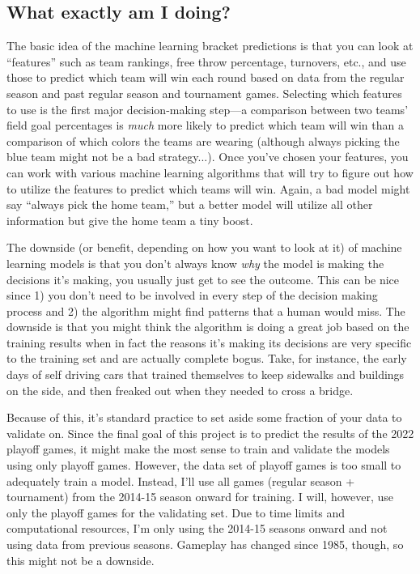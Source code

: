\documentclass[twocolumn]{aastex63}
\begin{document}
\subsection{What exactly am I doing?}
The basic idea of the machine learning bracket predictions is that you can look at ``features'' such as team rankings, free throw percentage, turnovers, etc., and use those to predict which team will win each round based on data from the regular season and past regular season and tournament games.
Selecting which features to use is the first major decision-making step---a comparison between two teams' field goal percentages is \textit{much} more likely to predict which team will win than a comparison of which colors the teams are wearing (although always picking the blue team might not be a bad strategy...).
Once you've chosen your features, you can work with various machine learning algorithms that will try to figure out how to utilize the features to predict which teams will win.
Again, a bad model might say ``always pick the home team,'' but a better model will utilize all other information but give the home team a tiny boost.

The downside (or benefit, depending on how you want to look at it) of machine learning models is that you don't always know \textit{why} the model is making the decisions it's making, you usually just get to see the outcome.
This can be nice since 1) you don't need to be involved in every step of the decision making process and 2) the algorithm might find patterns that a human would miss.
The downside is that you might think the algorithm is doing a great job based on the training results when in fact the reasons it's making its decisions are very specific to the training set and are actually complete bogus.
Take, for instance, the early days of self driving cars that trained themselves to keep sidewalks and buildings on the side, and then freaked out when they needed to cross a bridge.

Because of this, it's standard practice to set aside some fraction of your data to validate on. 
Since the final goal of this project is to predict the results of the 2022 playoff games, it might make the most sense to train and validate the models using only playoff games.
However, the data set of playoff games is too small to adequately train a model.
Instead, I'll use all games (regular season + tournament) from the 2014-15 season onward for training.
I will, however, use only the playoff games for the validating set.
Due to time limits and computational resources, I'm only using the 2014-15 seasons onward and not using data from previous seasons.
Gameplay has changed since 1985, though, so this might not be a downside.
\end{document}

